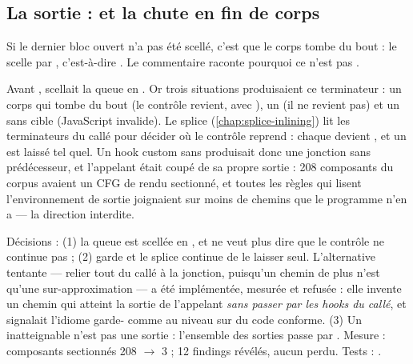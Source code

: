 \subsection{La sortie :  et la chute en fin de corps}


Si le dernier bloc ouvert n'a pas été scellé, c'est que le corps \og tombe du bout\fg{} :  le scelle par , c'est-à-dire . Le commentaire raconte pourquoi ce n'est pas .

\begin{decision}
Avant ,  scellait la queue en . Or trois situations produisaient ce terminateur : un corps qui tombe du bout (le contrôle revient, avec ), un  (il ne revient pas) et un  sans cible (JavaScript invalide). Le splice (\cref{chap:splice-inlining}) lit les terminateurs du callé pour décider où le contrôle reprend : chaque  devient , et un  est laissé tel quel. Un hook custom sans  produisait donc une jonction sans prédécesseur, et l'appelant était coupé de sa propre sortie : 208 composants du corpus avaient un CFG de rendu sectionné, et toutes les règles qui lisent l'environnement de sortie joignaient sur moins de chemins que le programme n'en a --- la direction interdite.

Décisions : (1) la queue est scellée en , et  ne veut plus dire que \og le contrôle ne continue pas\fg{} ; (2)  garde  et le splice continue de le laisser seul. L'alternative tentante --- relier tout  du callé à la jonction, puisqu'un chemin de plus n'est \og qu'une\fg{} sur-approximation --- a été implémentée, mesurée et refusée : elle invente un chemin qui atteint la sortie de l'appelant \emph{sans passer par les hooks du callé}, et signalait l'idiome \og garde-\fg{} comme  au niveau \Error{} sur du code conforme. (3) Un  inatteignable n'est pas une sortie : l'ensemble des sorties passe par . Mesure : composants sectionnés 208 $\to$ 3 ; 12 findings révélés, aucun perdu. Tests : .
\end{decision}


